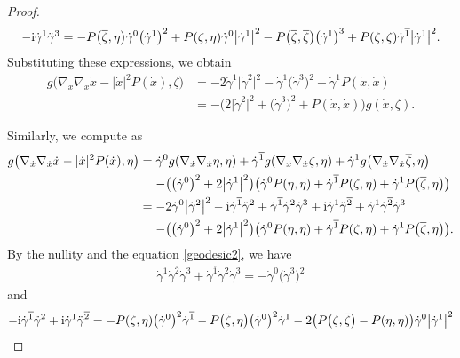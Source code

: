 \documentclass[pdftex]{sigma}
\newcommand\ol{\overline}
\numberwithin{equation}{section}
\begin{document}
\begin{proof}
\begin{gather*}
-{\rm i}\dot\gamma^1\ddot\gamma^3=-P\bigl(\ol\zeta, \eta\bigr)\dot\gamma^0\bigl(\dot\gamma^1\bigr)^2+P(\zeta, \eta)\dot\gamma^0\bigl|\dot\gamma^{1}\bigr|^2
-P\bigl(\ol\zeta, \ol\zeta\bigr)\bigl(\dot\gamma^1\bigr)^3+P(\zeta, \zeta)\dot\gamma^{\ol1}\bigl|\dot\gamma^{1}\bigr|^2.
\end{gather*}
Substituting these expressions, we obtain
\begin{align*}
g\bigl(\nabla_{\dot x}\nabla_{\dot x}\dot x-|\dot x|^2P(\dot x) ,\zeta\bigr)
&=-2\dot\gamma^1\bigl|\dot\gamma^2\bigr|^2-\dot\gamma^1\bigl(\dot\gamma^3\bigr)^2-\dot\gamma^1P(\dot x, \dot x) \\
&=-\bigl(2\bigl|\dot\gamma^2\bigr|^2+\bigl(\dot\gamma^3\bigr)^2+P(\dot x, \dot x)\bigr)g(\dot x, \zeta).
\end{align*}

Similarly, we compute as
\begin{align*}
g\bigl(\nabla_{\dot x}\nabla_{\dot x}\dot x-|\dot x|^2P(\dot x) ,\eta\bigr)
={}&\dot\gamma^0g(\nabla_{\dot x}\nabla_{\dot x}\eta, \eta)+
\dot\gamma^{\ol1}g(\nabla_{\dot x}\nabla_{\dot x}\zeta, \eta)+\dot\gamma^1g\bigl(\nabla_{\dot x}\nabla_{\dot x}\ol\zeta, \eta\bigr) \\
&{}{-}\bigl(\bigl(\dot\gamma^0\bigr)^2+2\bigl|\dot\gamma^1\bigr|^2\bigr)\bigl(\dot\gamma^0P(\eta, \eta)+\dot\gamma^{\ol1}P(\zeta, \eta)+\dot\gamma^1P\bigl(\ol\zeta, \eta\bigr)\bigr) \\
={}&{-}2\dot\gamma^0\bigl|\dot\gamma^2\bigr|^2-{\rm i}\dot\gamma^{\ol1}\ddot\gamma^2
+\dot\gamma^{\ol1}\dot\gamma^2\dot\gamma^3+{\rm i}\dot\gamma^1\ddot\gamma^{\ol2}+\dot\gamma^1\dot\gamma^{\ol2}\dot\gamma^3 \\
&{}{-}\bigl(\bigl(\dot\gamma^0\bigr)^2+2\bigl|\dot\gamma^1\bigr|^2\bigr)\bigl(\dot\gamma^0P(\eta, \eta)+\dot\gamma^{\ol1}P(\zeta, \eta)+\dot\gamma^1P\bigl(\ol\zeta, \eta\bigr)\bigr).
\end{align*}
By the nullity and the equation \eqref{geodesic2}, we have
\begin{align*}
\dot\gamma^1\dot\gamma^{\ol2}\dot\gamma^3+\dot\gamma^{\ol1}\dot\gamma^2\dot\gamma^3 =-\dot\gamma^0\bigl(\dot\gamma^3\bigr)^2
\end{align*}
and
\begin{align*}
-{\rm i}\dot\gamma^{\ol1}\ddot\gamma^2+{\rm i}\dot\gamma^1\ddot\gamma^{\ol2}
={}&{-}P(\zeta, \eta)\bigl(\dot\gamma^0\bigr)^2\dot\gamma^{\ol1} -P\bigl(\ol\zeta, \eta\bigr)\bigl(\dot\gamma^0\bigr)^2\dot\gamma^1-2\bigl(P\bigl(\zeta, \ol\zeta\bigr)-P(\eta, \eta)\bigr)
\dot\gamma^0\bigl|\dot\gamma^1\bigr|^2\\

\end{align*}
\end{proof}
\end{document}

